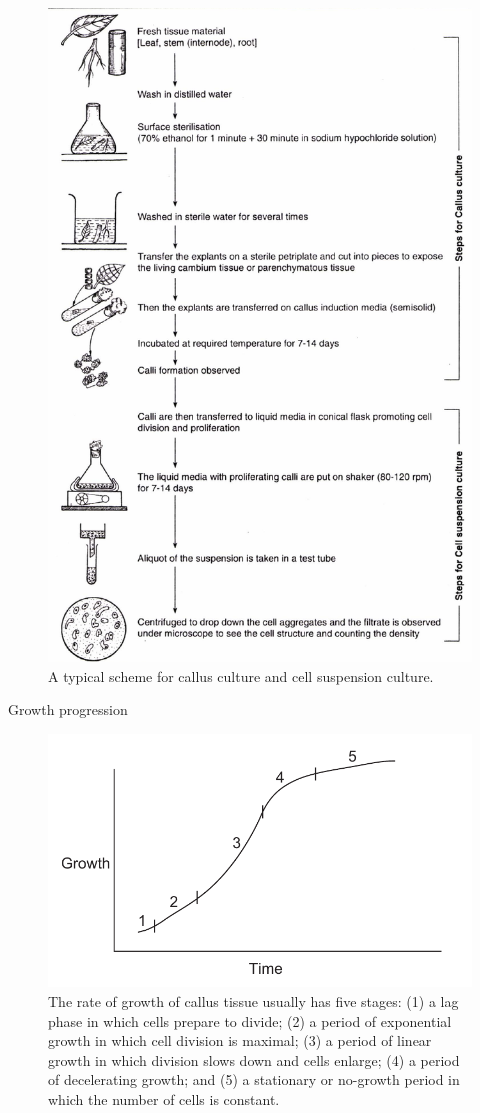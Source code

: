 \documentclass[
  ignorenonframetext,
  aspectratio=169]{beamer}
\begin{document}
\begin{frame}{}
\protect\hypertarget{section-12}{}
\begin{figure}
\includegraphics[width=0.38\linewidth]{../images/callus_cell_suspension_culture} \caption{A typical scheme for callus culture and cell suspension culture.}\label{fig:callus-cell-suspension-culture}
\end{figure}
\end{frame}

\begin{frame}{Growth progression}
\protect\hypertarget{growth-progression}{}
\begin{figure}
\includegraphics[width=0.6\linewidth]{../images/growth_curve} \caption{The rate of growth of callus tissue usually has five stages: (1) a lag phase in which cells prepare to divide; (2) a period of exponential growth in which cell division is maximal; (3) a period of linear growth in which division slows down and cells enlarge; (4) a period of decelerating growth; and (5) a stationary or no-growth period in which the number of cells is constant.}\label{fig:growth-curves}
\end{figure}
\end{frame}
\end{document}
